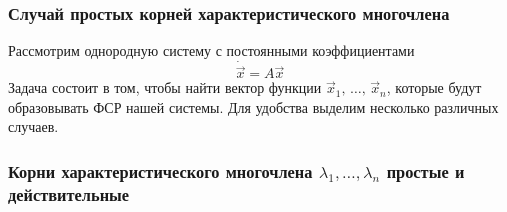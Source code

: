 \subsubsection*{Случай простых корней характеристического многочлена}
Рассмотрим однородную систему с постоянными коэффициентами
\begin{equation}
  \dot{\overrightarrow{x}} = A \overrightarrow{x} \label{eq:ODN}
\end{equation} 
Задача состоит в том, чтобы найти вектор функции $\overrightarrow{x}_1, \, \dots, \, \overrightarrow{x}_n$, которые будут образовывать ФСР нашей системы. Для удобства выделим несколько различных случаев.

\subsubsection*{Корни характеристического многочлена $\lambda_1, \dots, \lambda_n$ простые и действительные}

